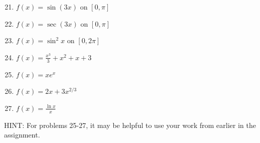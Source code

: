 \documentclass[12pt]{article}
\newif\ifans
\begin{document}

\begin{enumerate}
\setcounter{enumi}{20}

\item $f(x) = \sin{(3x)}$ on $[0,\pi]$ 

\ifans{\fbox{Relative maxima at $\left(\frac{\pi}{6},1\right)$ and $\left(\frac{5\pi}{6},1\right)$; Relative minimum at $\left(\frac{\pi}{2},-1\right)$}} \fi

\item $f(x) = \sec{(3x)}$ on $[0,\pi]$ 

\ifans{\fbox{Relative minima at $(0,1)$ and $\left(\frac{2\pi}{3},1\right)$; Relative maxima at $\left(\frac{\pi}{3},-1\right)$ and $(\pi,-1)$}} \fi

\end{enumerate}


\begin{enumerate}
\setcounter{enumi}{22}

\item $f(x) = \sin^{2}{x} \text{ on } [0,2\pi]$ 

\ifans{\fbox{\parbox{0.55\linewidth}{
Relative minima at $(0,0)$, $(\pi,0)$, and $(2\pi,0)$;\\
Relative maxima at $\left(\frac{\pi}{2},1,\right)$ and $\left(\frac{3\pi}{2},1\right)$}}} \fi

\item $f(x)=\frac{x^3}{3}+x^2+x+3$

\ifans{\fbox{No relative extrema}} \fi

\item $f(x) = xe^x$  

\ifans{\fbox{Relative minimum at $\left(-1,-\frac{1}{e}\right)$}} \fi

\item $f(x)=2x+3x^{2/3}$

\ifans{\fbox{Relative maximum at $(-1,1)$; Relative minimum at $(0,0)$}} \fi

\item $f(x)=\frac{\ln{x}}{x}$

\ifans{\fbox{Relative Maximum at $\left(e,\frac{1}{e}\right)$}} \fi

\end{enumerate}

\noindent HINT: For problems 25-27, it may be helpful to use your work from earlier in the assignment.
\end{document}
